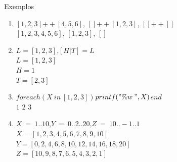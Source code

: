 \begin{frame}
	
    \begin{exampleblock}{Exemplos}
		
        \begin{enumerate}
        
			\item $[1,2,3]$\:$++$\:$[4,5,6]$, \: $[]$\:$++$\:$[1,2,3]$, \: $[]$\:$++$\:$[]$\\
            \pause
            $[1,2,3,4,5,6]$, \:$[1,2,3]$, \:$[]$
            \medskip
            \pause
            
            \item $L = [1,2,3]$,\:\:$[H|T] = L$\\
            \pause
            $L = [1,2,3]$\\ \pause
            $H = 1$\\ \pause
            $T = [2,3]$
            \medskip
            \pause
            
            \item $foreach(X\:in\:[1,2,3])$\:\:$printf("\%w\:",X)$\:\:$end$\\
            \pause
            $1$ $2$ $3$
            \medskip
            \pause
            
            \item $X\:=\:1..10$,\:\:$Y\:=\:0..2..20$,\:\:$Z\:=\:10..-1..1$\\
            \pause
            $X = [1,2,3,4,5,6,7,8,9,10]$\\ \pause
            $Y = [0,2,4,6,8,10,12,14,16,18,20]$\\ \pause
            $Z = [10,9,8,7,6,5,4,3,2,1]$
            
		\end{enumerate}
        
	\end{exampleblock}
    
\end{frame}